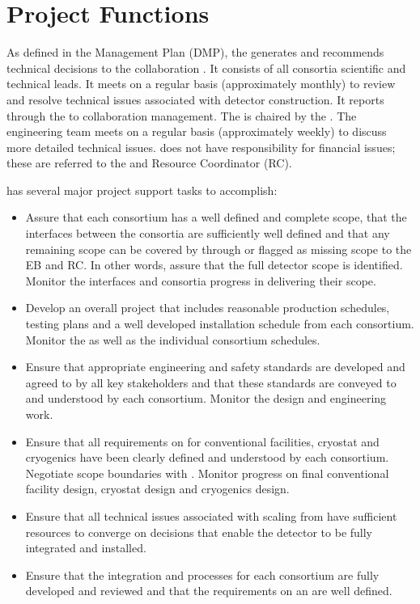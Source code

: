 \chapter{Project Functions}
\label{vl:tc-project}

As defined in the  Management Plan (DMP), the 
 generates and recommends technical decisions to the
 collaboration .
It consists of all consortia scientific and technical leads. It meets
on a regular basis (approximately monthly) to review and resolve
technical issues associated with detector construction. It reports
through the  to collaboration management. The  
is chaired by the  . The
 engineering team meets on a regular basis (approximately weekly)
to discuss more detailed technical issues.  does not have
responsibility for financial issues; these are referred to
the  and Resource Coordinator (RC).

 has several major project support tasks to accomplish:
\begin{itemize}
\item Assure that each consortium has a well defined and complete
  scope, that the interfaces between the consortia are sufficiently
  well defined and that any remaining scope can be covered by 
  through  or flagged as missing scope to the EB and RC. In
  other words, assure that the full detector scope is
  identified. Monitor the interfaces and consortia progress in
  delivering their scope.
\item Develop an overall project 
  that includes reasonable production schedules, testing plans and a
  well developed installation schedule from each consortium. Monitor
  the  as well as the individual consortium schedules.
\item Ensure that appropriate engineering and safety standards are
  developed and agreed to by all key stakeholders and that these
  standards are conveyed to and understood by each
  consortium. Monitor the design and engineering work.
\item Ensure that all  requirements on  for
  conventional facilities, cryostat and cryogenics have been clearly
  defined and understood by each consortium. Negotiate scope
  boundaries with . Monitor  progress on
  final conventional facility design, cryostat design and cryogenics
  design.
\item Ensure that all technical issues associated with scaling from
   have sufficient resources to converge on
  decisions that enable the detector to be fully integrated and
  installed.
\item Ensure that the integration and  processes for each
  consortium are fully developed and reviewed and that the
  requirements on an  are well defined.
\end{itemize}

